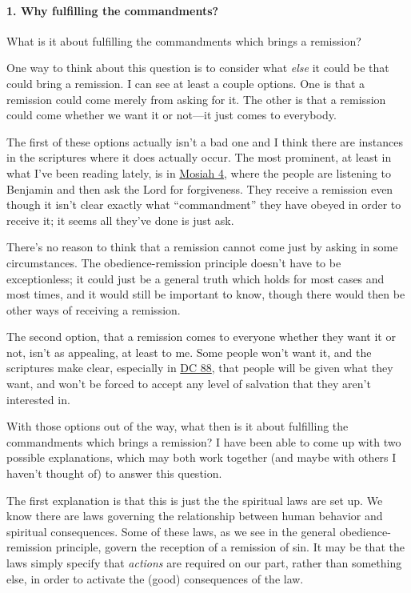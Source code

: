 			\paragraph{1. Why fulfilling the commandments?}
				\label{REMISSION-commandments-why}
			
				What is it about fulfilling the commandments which brings a remission?
				
				One way to think about this question is to consider what \textit{else} it could be that could bring a remission. I can see at least a couple options. One is that a remission could come merely from asking for it. The other is that a remission could come whether we want it or not---it just comes to everybody.
				
				The first of these options actually isn't a bad one and I think there are instances in the scriptures where it does actually occur. The most prominent, at least in what I've been reading lately, is in \hyperref[MOSIAH-4]{Mosiah 4}, where the people are listening to Benjamin and then ask the Lord for forgiveness. They receive a remission even though it isn't clear exactly what ``commandment'' they have obeyed in order to receive it; it seems all they've done is just ask.
				
				There's no reason to think that a remission cannot come just by asking in some circumstances. The obedience-remission principle doesn't have to be exceptionless; it could just be a general truth which holds for most cases and most times, and it would still be important to know, though there would then be other ways of receiving a remission.
				
				The second option, that a remission comes to everyone whether they want it or not, isn't as appealing, at least to me. Some people won't want it, and the scriptures make clear, especially in \hyperref[DC88]{DC 88}, that people will be given what they want, and won't be forced to accept any level of salvation that they aren't interested in.
				
				With those options out of the way, what then is it about fulfilling the commandments which brings a remission? I have been able to come up with two possible explanations, which may both work together (and maybe with others I haven't thought of) to answer this question.
				
				The first explanation is that this is just the the spiritual laws are set up. We know there are laws governing the relationship between human behavior and spiritual consequences. Some of these laws, as we see in the general obedience-remission principle, govern the reception of a remission of sin. It may be that the laws simply specify that \textit{actions} are required on our part, rather than something else, in order to activate the (good) consequences of the law.
				
